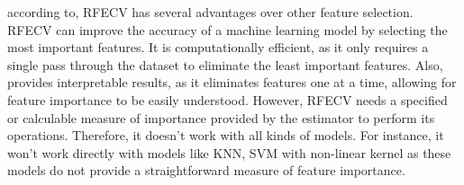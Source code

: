 \documentclass[12pt]{report}
\begin{document}
according to\cite{10.3389/fbioe.2020.00496}, RFECV has several advantages over
other feature selection. RFECV can improve the accuracy of a machine learning
model by selecting the most important features. It is computationally
efficient, as it only requires a single pass through the dataset to eliminate
the least important features. Also, provides interpretable results, as it
eliminates features one at a time, allowing for feature importance to be easily
understood. However, RFECV needs a specified or calculable measure of
importance provided by the estimator to perform its operations. Therefore, it
doesn't work with all kinds of models. For instance, it won't work directly
with models like KNN, SVM with non-linear kernel as these models do not provide
a straightforward measure of feature importance.\newpage


\end{document}
